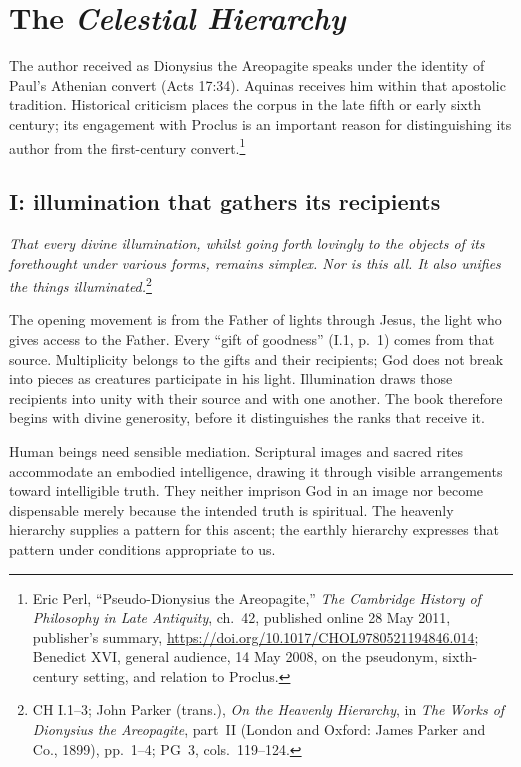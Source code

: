 \section{The \emph{Celestial Hierarchy}}
\label{sec:celestial-hierarchy}

The author received as Dionysius the Areopagite speaks under the identity of Paul's Athenian convert (Acts 17:34). Aquinas receives him within that apostolic tradition. Historical criticism places the corpus in the late fifth or early sixth century; its engagement with Proclus is an important reason for distinguishing its author from the first-century convert.\footnote{Eric Perl, ``Pseudo-Dionysius the Areopagite,'' \emph{The Cambridge History of Philosophy in Late Antiquity}, ch.~42, published online 28 May 2011, publisher's summary, \url{https://doi.org/10.1017/CHOL9780521194846.014}; Benedict XVI, general audience, 14 May 2008, on the pseudonym, sixth-century setting, and relation to Proclus.}

\subsection{I: illumination that gathers its recipients}
\emph{That every divine illumination, whilst going forth lovingly to the objects of its forethought under various forms, remains simplex. Nor is this all. It also unifies the things illuminated.}\footnote{CH I.1--3; John Parker (trans.), \emph{On the Heavenly Hierarchy}, in \emph{The Works of Dionysius the Areopagite}, part~II (London and Oxford: James Parker and Co., 1899), pp.~1--4; PG~3, cols.~119--124.}

The opening movement is from the Father of lights through Jesus, the light who gives access to the Father. Every ``gift of goodness'' (I.1, p.~1) comes from that source. Multiplicity belongs to the gifts and their recipients; God does not break into pieces as creatures participate in his light. Illumination draws those recipients into unity with their source and with one another. The book therefore begins with divine generosity, before it distinguishes the ranks that receive it.

Human beings need sensible mediation. Scriptural images and sacred rites accommodate an embodied intelligence, drawing it through visible arrangements toward intelligible truth. They neither imprison God in an image nor become dispensable merely because the intended truth is spiritual. The heavenly hierarchy supplies a pattern for this ascent; the earthly hierarchy expresses that pattern under conditions appropriate to us.

